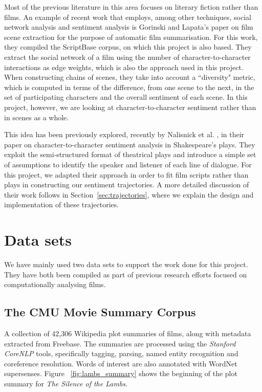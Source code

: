 \documentclass[bsc,frontabs,deptreport,singlespacing,parskip, twoside]{infthesis}
\begin{document}
Most of the previous literature in this area focuses on literary fiction rather than films. An example of recent work that employs, among other techniques, social network analysis and sentiment analysis is Gorinski and Lapata's paper \cite{Gorinski2015} on film scene extraction for the purpose of automatic film summarisation. For this work, they compiled the ScriptBase corpus, on which this project is also based. They extract the social network of a film using the number of character-to-character interactions as edge weights, which is also the approach used in this project. When constructing chains of scenes, they take into account a ``diversity" metric, which is computed in terms of the difference, from one scene to the next, in the set of participating characters and the overall sentiment of each scene. In this project, however, we are looking at character-to-character sentiment rather than in scenes as a whole.

This idea has been previously explored, recently by Nalisnick et al. \cite{Nalisnick2013}, in their paper on character-to-character sentiment analysis in Shakespeare's plays. They exploit the semi-structured format of theatrical plays and introduce a simple set of assumptions to identify the speaker and listener of each line of dialogue. For this project, we adapted their approach in order to fit film scripts rather than plays in constructing our sentiment trajectories. A more detailed discussion of their work follows in Section~\ref{sec:trajectories}, where we explain the design and implementation of these trajectories.

\section{Data sets} \label{sec:data sets}
We have mainly used two data sets to support the work done for this project. They have both been compiled as part of previous research efforts focused on computationally analysing films.

\subsection{The CMU Movie Summary Corpus}
A collection of 42,306 Wikipedia plot summaries of films, along with metadata extracted from Freebase. The summaries are processed using the \textit{Stanford CoreNLP} tools, specifically tagging, parsing, named entity recognition and coreference resolution. Words of interest are also annotated with WordNet supersenses. Figure~ \ref{fig:lambs_summary} shows the beginning of the plot summary for \textit{The Silence of the Lambs}.
\end{document}
